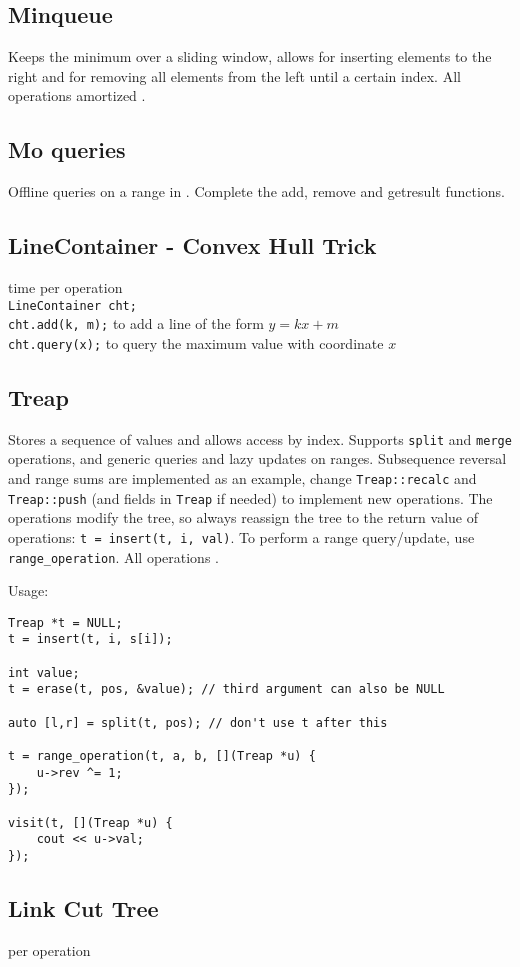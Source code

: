 \subsection{Minqueue}
Keeps the minimum over a sliding window, allows for inserting elements to the right and for removing all elements from the left until a certain index. All operations amortized .

\subsection{Mo queries}
Offline queries on a range in . Complete the add, remove and getresult functions.

\subsection{LineContainer - Convex Hull Trick}

 time per operation \\
\verb|LineContainer cht;| \\
\verb|cht.add(k, m);| to add a line of the form $y = kx + m$ \\
\verb|cht.query(x);| to query the maximum value with coordinate $x$

\subsection{Treap}

Stores a sequence of values and allows access by index. Supports \texttt{split} and \texttt{merge} operations, and generic queries and lazy updates on ranges. Subsequence reversal and range sums are implemented as an example, change \texttt{Treap::recalc} and \texttt{Treap::push} (and fields in \texttt{Treap} if needed) to implement new operations.
The operations modify the tree, so always reassign the tree to the return value of operations: \texttt{t = insert(t, i, val)}. To perform a range query/update, use \texttt{range\_operation}.
All operations .

Usage:
\begin{lstlisting}
Treap *t = NULL;
t = insert(t, i, s[i]);

int value;
t = erase(t, pos, &value); // third argument can also be NULL

auto [l,r] = split(t, pos); // don't use t after this

t = range_operation(t, a, b, [](Treap *u) {
	u->rev ^= 1;
});

visit(t, [](Treap *u) {
	cout << u->val;
});
\end{lstlisting}


\subsection{Link Cut Tree}
 per operation
